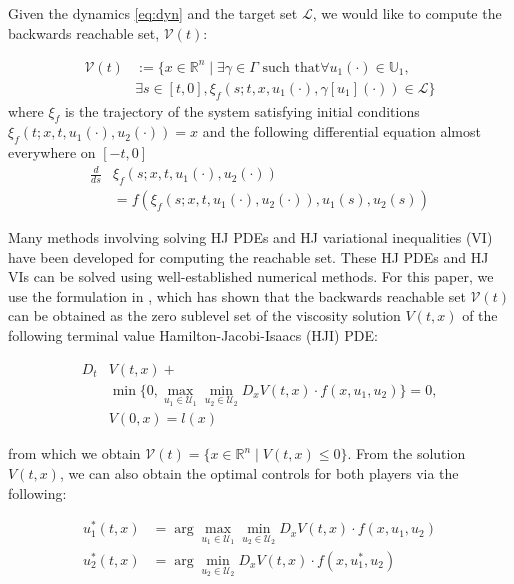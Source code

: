 Given the dynamics \eqref{eq:dyn} and the target set $\mathcal{L}$, we would like to compute the backwards reachable set, $\mathcal{V}(t)$:

\begin{equation}
\begin{aligned}
\mathcal{V}(t) &:= \{x\in\mathbb{R}^n \mid \exists \gamma\in\Gamma \text{ such that} \forall u_1(\cdot)\in\mathbb{U}_1, \\
&\exists s \in [t,0], \xi_f(s; t, x, u_1(\cdot), \gamma[u_1](\cdot)) \in \mathcal{L} \}
\end{aligned}
\end{equation}
where $\xi_f$ is the trajectory of the system satisfying initial conditions $\xi_f(t; x, t, u_1(\cdot), u_2(\cdot))=x$ and the following differential equation almost everywhere on $[-t, 0]$
\begin{equation}
\begin{aligned}
\frac{d}{ds}&\xi_f(s; x, t, u_1(\cdot), u_2(\cdot)) \\
&= f(\xi_f(s; x, t, u_1(\cdot), u_2(\cdot)), u_1(s), u_2(s))
\end{aligned}
\end{equation}

Many methods involving solving HJ PDEs \cite{Mitchell05} and HJ variational inequalities (VI) \cite{Bokanowski10,Barron89,Fisac15} have been developed for computing the reachable set. These HJ PDEs and HJ VIs can be solved using well-established numerical methods. For this paper, we use the formulation in \cite{Mitchell05}, which has shown that the backwards reachable set $\mathcal{V}(t)$ can be obtained as the zero sublevel set of the viscosity solution \cite{Crandall84} $V(t,x)$ of the following terminal value Hamilton-Jacobi-Isaacs (HJI) PDE:

\begin{equation} \label{eq:HJIPDE}
\begin{aligned}
D_t &V(t,x) + \\
&\min \{0, \max_{u_1\in\mathcal{U}_1} \min_{u_2\in\mathcal{U}_2} D_x V(t,x) \cdot f(x,u_1,u_2) \} = 0, \\
&V(0,x) = l(x)
\end{aligned}
\end{equation}

\noindent from which we obtain $\mathcal{V}(t) = \{x\in\mathbb{R}^n \mid V(t,x)\le 0\}$. From the solution $V(t,x)$, we can also obtain the optimal controls for both players via the following:

\begin{equation} \label{eq:HJI_ctrl_syn}
\begin{aligned}
u_1^*(t,x) &= \arg \max_{u_1\in\mathcal{U}_1} \min_{u_2\in\mathcal U_2} D_x V(t,x) \cdot f(x,u_1,u_2)\\
u_2^*(t,x) &= \arg \min_{u_2\in\mathcal{U}_2} D_x V(t,x) \cdot f(x,u_1^*,u_2)
\end{aligned}
\end{equation}

